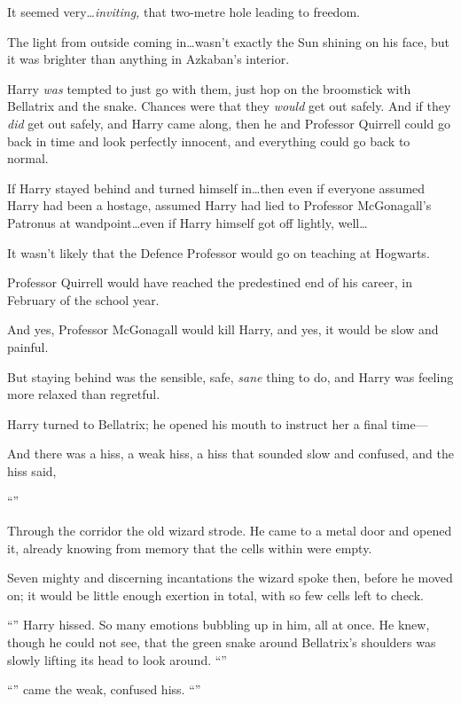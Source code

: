 It seemed very…\emph{inviting,} that two-metre hole leading to freedom.

The light from outside coming in…wasn’t exactly the Sun shining on his face, but it was brighter than anything in Azkaban’s interior.

Harry \emph{was} tempted to just go with them, just hop on the broomstick with Bellatrix and the snake. Chances were that they \emph{would} get out safely. And if they \emph{did} get out safely, and Harry came along, then he and Professor Quirrell could go back in time and look perfectly innocent, and everything could go back to normal.

If Harry stayed behind and turned himself in…then even if everyone assumed Harry had been a hostage, assumed Harry had lied to Professor McGonagall’s Patronus at wandpoint…even if Harry himself got off lightly, well…

It wasn’t likely that the Defence Professor would go on teaching at Hogwarts.

Professor Quirrell would have reached the predestined end of his career, in February of the school year.

And yes, Professor McGonagall would kill Harry, and yes, it would be slow and painful.

But staying behind was the sensible, safe, \emph{sane} thing to do, and Harry was feeling more relaxed than regretful.

Harry turned to Bellatrix; he opened his mouth to instruct her a final time—

And there was a hiss, a weak hiss, a hiss that sounded slow and confused, and the hiss said,

“”

\later

Through the corridor the old wizard strode. He came to a metal door and opened it, already knowing from memory that the cells within were empty.

Seven mighty and discerning incantations the wizard spoke then, before he moved on; it would be little enough exertion in total, with so few cells left to check.

\later

“” Harry hissed. So many emotions bubbling up in him, all at once. He knew, though he could not see, that the green snake around Bellatrix’s shoulders was slowly lifting its head to look around. “”

“” came the weak, confused hiss. “”

